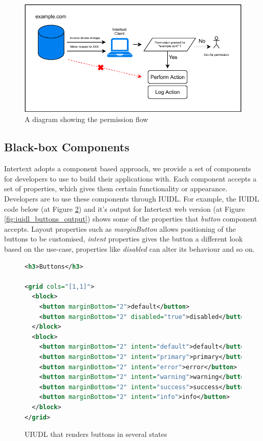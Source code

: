 \begin{figure}
  \centering
  \includegraphics[width=13cm]{thesis/paper/images/permission.pdf}
  \caption{A diagram showing the permission flow}%
  \label{fig:permission_flow}%
\end{figure}


\subsection{Black-box Components}

Intertext adopts a component based approach, we provide a set of components for developers to use to build their applications with. Each component accepts a set of properties, which gives them certain functionality or appearance. Developers are to use these components through IUIDL. For example, the IUIDL code below (at Figure \ref{fig:iuidl_buttons}) and it's output for Intertext web version (at Figure \ref{fig:iuidl_buttons_output}) shows some of the properties that \textit{button} component accepts. Layout properties such as  \textit{marginButton} allows positioning of the buttons to be customised, \textit{intent} properties gives the button a different look based on the use-case, properties like \textit{disabled} can alter its behaviour and so on.

\begin{figure}
\begin{minipage}{\linewidth}
\begin{lstlisting}[language=xml]
<h3>Buttons</h3>

<grid cols="[1,1]">
  <block>
    <button marginBottom="2">default</button>
    <button marginBottom="2" disabled="true">disabled</button>
  </block>
  <block>
    <button marginBottom="2" intent="default">default</button>
    <button marginBottom="2" intent="primary">primary</button>
    <button marginBottom="2" intent="error">error</button>
    <button marginBottom="2" intent="warning">warning</button>
    <button marginBottom="2" intent="success">success</button>
    <button marginBottom="2" intent="info">info</button>
  </block>
</grid>
\end{lstlisting}
\end{minipage}
\caption{UIUDL that renders buttons in several states}%
\label{fig:iuidl_buttons}%
\end{figure}

